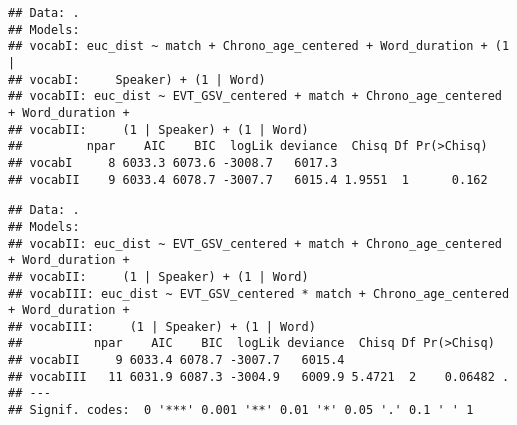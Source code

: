 \documentclass[
]{article}
\newenvironment{Shaded}{\begin{snugshade}}{\end{snugshade}}
\newcommand{\AttributeTok}[1]{\textcolor[rgb]{0.77,0.63,0.00}{#1}}
\newcommand{\CommentTok}[1]{\textcolor[rgb]{0.56,0.35,0.01}{\textit{#1}}}
\newcommand{\ConstantTok}[1]{\textcolor[rgb]{0.00,0.00,0.00}{#1}}
\newcommand{\DecValTok}[1]{\textcolor[rgb]{0.00,0.00,0.81}{#1}}
\newcommand{\FunctionTok}[1]{\textcolor[rgb]{0.00,0.00,0.00}{#1}}
\newcommand{\NormalTok}[1]{#1}
\newcommand{\OtherTok}[1]{\textcolor[rgb]{0.56,0.35,0.01}{#1}}
\newcommand{\SpecialCharTok}[1]{\textcolor[rgb]{0.00,0.00,0.00}{#1}}
\newcommand{\StringTok}[1]{\textcolor[rgb]{0.31,0.60,0.02}{#1}}
\begin{document}
\begin{verbatim}
## Data: .
## Models:
## vocabI: euc_dist ~ match + Chrono_age_centered + Word_duration + (1 | 
## vocabI:     Speaker) + (1 | Word)
## vocabII: euc_dist ~ EVT_GSV_centered + match + Chrono_age_centered + Word_duration + 
## vocabII:     (1 | Speaker) + (1 | Word)
##         npar    AIC    BIC  logLik deviance  Chisq Df Pr(>Chisq)
## vocabI     8 6033.3 6073.6 -3008.7   6017.3                     
## vocabII    9 6033.4 6078.7 -3007.7   6015.4 1.9551  1      0.162
\end{verbatim}

\begin{Shaded}
\end{Shaded}

\begin{verbatim}
## Data: .
## Models:
## vocabII: euc_dist ~ EVT_GSV_centered + match + Chrono_age_centered + Word_duration + 
## vocabII:     (1 | Speaker) + (1 | Word)
## vocabIII: euc_dist ~ EVT_GSV_centered * match + Chrono_age_centered + Word_duration + 
## vocabIII:     (1 | Speaker) + (1 | Word)
##          npar    AIC    BIC  logLik deviance  Chisq Df Pr(>Chisq)  
## vocabII     9 6033.4 6078.7 -3007.7   6015.4                       
## vocabIII   11 6031.9 6087.3 -3004.9   6009.9 5.4721  2    0.06482 .
## ---
## Signif. codes:  0 '***' 0.001 '**' 0.01 '*' 0.05 '.' 0.1 ' ' 1
\end{verbatim}
\end{document}

